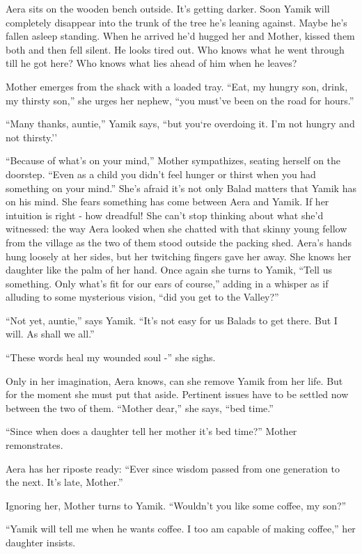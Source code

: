 \documentclass[twoside,11pt]{book}
\begin{document}
Aera sits on the wooden bench
outside. It's getting darker.
Soon Yamik will completely disappear into the trunk of the tree he's
leaning against. Maybe he's fallen asleep standing. When he arrived he'd hugged her and Mother, kissed them both and
then fell silent. He looks tired out. Who knows what he went through till he got here? Who knows what lies ahead of him
when he leaves?

Mother emerges from the shack with a loaded tray. ``Eat, my hungry
son, drink, my thirsty son,'' she urges her
nephew, ``you must've been on the road for
hours.''

``Many thanks, auntie,'' Yamik says, ``but
you`re overdoing it. I'm not hungry and not thirsty.''

``Because of what's on your mind,'' Mother sympathizes, seating herself on the doorstep. ``Even as a child you
didn't feel hunger or thirst when you had something on your mind.''  She's afraid it's not only Balad matters that
Yamik has on his mind. She fears something has come between Aera and Yamik. If her intuition is right - how dreadful!
She can't stop thinking about what she'd witnessed: the way Aera looked when she chatted with that
skinny young fellow from the village as the two of them stood outside the packing shed. Aera's
hands hung loosely at her sides, but her twitching fingers gave her away.  She knows her daughter like the palm of her
hand.  Once again she turns to Yamik, ``Tell us something. Only what's fit for our ears of course,'' adding in a
whisper as if alluding to some mysterious vision, ``did you get to the Valley?''

``Not yet, auntie,'' says Yamik. ``It's not easy for us Balads to get there. But I will. As shall we all.''

``These words heal my wounded soul -'' she sighs.

Only in her imagination, Aera knows, can she remove Yamik from her life. But for the moment she must put that aside.
Pertinent issues have to be settled now between the two of them. ``Mother dear,'' she says, ``bed time.''

``Since when does a daughter tell her mother it's bed time?'' Mother remonstrates.

Aera has her riposte ready: ``Ever since wisdom passed from one generation to the next. It's late, Mother.''

Ignoring her, Mother turns to Yamik. ``Wouldn't you like some coffee, my son?''

``Yamik will tell me when he wants coffee. I too am capable of making coffee,'' her daughter insists.
\end{document}
